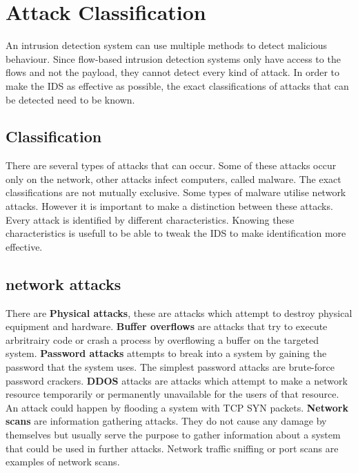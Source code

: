 
\chapter{Attack Classification} %

\label{attack} %

An intrusion detection system can use multiple methods to detect malicious behaviour.  Since flow-based intrusion detection systems only have access to the flows and not the payload, they cannot detect every kind of attack. In order to make the IDS as effective as possible, the exact classifications of attacks that can be detected need to be known.

\section{Classification}
There are several types of attacks that can occur. Some of these attacks occur only on the network, other attacks infect computers, called malware. The exact classifications are not mutually exclusive. Some types of malware utilise network attacks. However it is important to make a distinction between these attacks. Every attack is identified by different characteristics. Knowing these characteristics is usefull to be able to tweak the IDS to make identification more effective.

\section{network attacks}
There are \textbf{Physical attacks}, these are attacks which attempt to destroy physical equipment and hardware. \textbf{Buffer overflows} are attacks that try to execute arbritrairy code or crash a process by overflowing a buffer on the targeted system. \textbf{Password attacks} attempts to break into a system by gaining the password that the system uses. The simplest password attacks are brute-force password crackers. \textbf{DDOS} attacks are attacks which attempt to make a network resource temporarily or permanently unavailable for the users of that resource. An attack could happen by flooding a system with TCP SYN packets. \textbf{Network scans} are information gathering attacks. They do not cause any damage by themselves but usually serve the purpose to gather information about a system that could be used in further attacks. Network traffic sniffing or port scans are examples of network scans.

